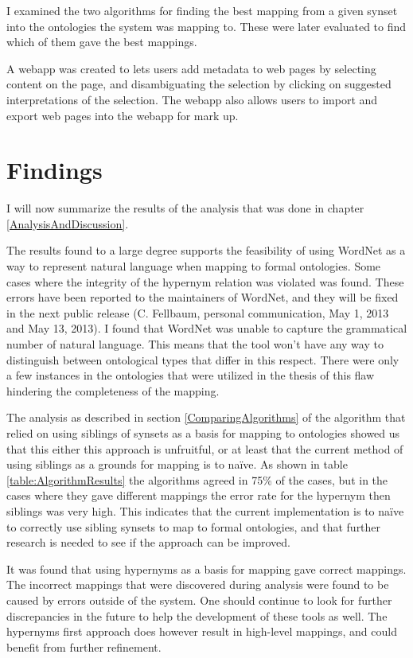 I examined the two algorithms for finding the best mapping from a given synset into the ontologies the system was mapping to.
These were later evaluated to find which of them gave the best mappings.

A webapp was created to lets users add metadata to web pages by selecting content on the page,
and disambiguating the selection by clicking on suggested interpretations of the selection.
The webapp also allows users to import and export web pages into the webapp for mark up.

\section{Findings}
I will now summarize the results of the analysis that was done in chapter \ref{AnalysisAndDiscussion}.

The results found to a large degree supports the feasibility of using WordNet as a way to represent natural language
when mapping to formal ontologies.
Some cases where the integrity of the hypernym relation was violated was found.
These errors have been reported to the maintainers of WordNet, and they will be fixed in the next public  release (C. Fellbaum, personal communication, May 1, 2013 and May 13, 2013).
I found that WordNet was unable to capture the grammatical number of natural language.
This means that the tool won't have any way to distinguish between ontological types that differ in this respect.
There were only a few instances in the ontologies that were utilized in the thesis of this flaw hindering the completeness of the mapping.

The analysis as described in section \ref{ComparingAlgorithms} of the algorithm that relied on
using siblings of synsets as a basis for mapping to ontologies showed us that this either this approach is unfruitful,
or at least that the current method of using siblings as a grounds for mapping is to naïve.
As shown in table \ref{table:AlgorithmResults} the algorithms agreed in 75\% of the cases,
but in the cases where they gave different mappings the error rate for the hypernym then siblings was very high.
This indicates that the current implementation is to naïve to correctly use sibling synsets to map to formal ontologies,
and that further research is needed to see if the approach can be improved.

It was found that using hypernyms as a basis for mapping gave correct mappings.
The incorrect mappings that were discovered during analysis were found to be caused by errors outside of the system.
One should continue to look for further discrepancies in the future to help the development of these tools as well.
The hypernyms first approach does however result in high-level mappings, and could benefit from further refinement.

